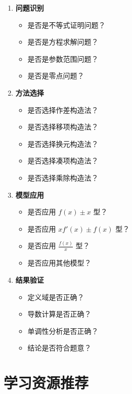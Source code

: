\documentclass[a4paper,11pt]{ctexrep}
\theoremstyle{definition}
\begin{document}
\begin{tipbox}[快速检查清单]
\begin{enumerate}
    \item \textbf{问题识别}
    \begin{itemize}
        \item 是否是不等式证明问题？
        \item 是否是方程求解问题？
        \item 是否是参数范围问题？
        \item 是否是零点问题？
    \end{itemize}
    
    \item \textbf{方法选择}
    \begin{itemize}
        \item 是否选择作差构造法？
        \item 是否选择移项构造法？
        \item 是否选择换元构造法？
        \item 是否选择凑项构造法？
        \item 是否选择乘除构造法？
    \end{itemize}
    
    \item \textbf{模型应用}
    \begin{itemize}
        \item 是否应用 $f(x) \pm x$ 型？
        \item 是否应用 $xf'(x) \pm f(x)$ 型？
        \item 是否应用 $\frac{f(x)}{x}$ 型？
        \item 是否应用其他模型？
    \end{itemize}
    
    \item \textbf{结果验证}
    \begin{itemize}
        \item 定义域是否正确？
        \item 导数计算是否正确？
        \item 单调性分析是否正确？
        \item 结论是否符合题意？
    \end{itemize}
\end{enumerate}
\end{tipbox}

\section{学习资源推荐}
\end{document}
